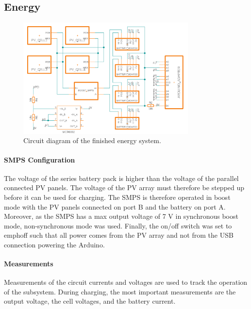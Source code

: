 \documentclass[a4paper]{article}
\begin{document}
\subsection{Energy}
\vspace{-10pt}
\begin{figure}[H]
    \centering
    \includegraphics[width=0.8\textwidth]{Circuit_Diagram.png}
    \caption{Circuit diagram of the finished energy system.}
    \label{fig:circuitDiagram}
\end{figure}
\paragraph*{SMPS Configuration}
The voltage of the series battery pack is higher than the voltage of 
the parallel connected PV panels. The voltage of the PV array must 
therefore be stepped up before it can be used for charging. The SMPS 
is therefore operated in boost mode with the PV panels connected on 
port B and the battery on port A. Moreover, as the SMPS has a max 
output voltage of 7 V in synchronous boost mode\cite{powerLogbook}, 
non-synchronous mode was used. Finally, the on/off switch was set 
to emph{off} such that all power comes from the PV array and not 
from the USB connection powering the Arduino.

\paragraph*{Measurements}
Measurements of the circuit currents and voltages are used to track the 
operation of the subsystem. During charging, the most important measurements 
are the output voltage, the cell voltages, and the battery current.
\end{document}
